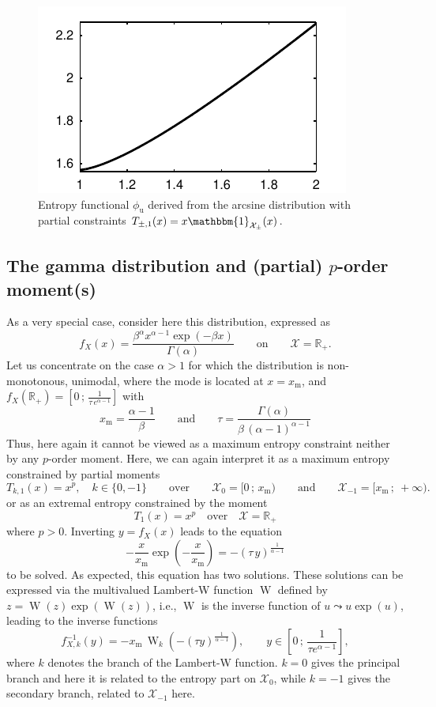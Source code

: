 \documentclass[english,sort&compress]{elsarticle}
\theoremstyle{definition}
\theoremstyle{plain}
\theoremstyle{plain}
\def\Rset{\mathbb{R}}
\def\X{\mathcal{X}}
\def\un{\mathbbm{1}}
\def\W{\operatorname{W}}
\begin{document}
\begin{figure}[htbp]
\centerline{\includegraphics[width=.43\textwidth]{PDF/MaxEnt_ArcsineLaw}}
\caption{Entropy  functional   $\phi_{\mathrm{u}}$  derived  from   the  arcsine
  distribution with partial constraints $T_{\pm,1}(x) = x \un_{\X_\pm}(x)$.}
\label{fig:Entropy-arcsin}
\end{figure}



\subsection{The gamma distribution and (partial) $p$-order moment(s)}

\label{subsec:GammaFirstOrder}

As a very special case, consider here this distribution, expressed
as
%
\[
f_X(x) = \frac{\beta^\alpha  x^{\alpha-1} \exp(-\beta x)}{\Gamma(\alpha)} \qquad
\mbox{on} \qquad \X = \Rset_+.
\]
%
Let  us concentrate  on the  case $\alpha  > 1$  for which  the  distribution is
non-monotonous, unimodal, where the mode is located at $x = x_{\mathrm{m}}$, and
$f_X(\Rset_+) = \left[ 0 \, ; \, \frac1{\tau \,e^{\alpha-1}} \right]$ with
%
\[
x_{\mathrm{m}}  =   \frac{\alpha-1}{\beta}  \qquad  \mbox{and}   \qquad  \tau  =
\frac{\Gamma(\alpha)}{\beta \, (\alpha-1)^{\alpha-1}}
\]
%
Thus, here again it cannot be  viewed as a maximum entropy constraint neither by
any $p$-order  moment.  Here,  we can  again interpret it  as a  maximum entropy
constrained by partial moments
%
\[
T_{k,1}(x) = x^p, \quad k \in \{ 0  , -1 \} \qquad \mbox{over} \qquad \X_0 = [ 0
\, ; \, x_{\mathrm{m}} ) \qquad  \mbox{and} \qquad \X_{-1} = [ x_{\mathrm{m}} \,
; \: +\infty ).
\]
%
or as an extremal entropy constrained by the moment 
%
\[
T_1(x) = x^p \quad \mbox{over} \quad \X = \Rset_+
\]
%
where $p > 0$. Inverting $y = f_X(x)$ leads to the equation
%
\[
-  \frac{x}{x_{\mathrm{m}}} \exp\left(  - \frac{x}{x_{\mathrm{m}}}  \right)  = -
(\tau  \,  y )^{\frac{1}{\alpha -  1}}
\]
%
to be solved. As expected, this  equation has two solutions. These solutions can
be  expressed   via  the   multivalued  Lambert-W   function  $\W$   defined  by
$z=\W(z)\exp(\W(z))$,  i.e., $\W$  is  the  inverse function  of  $u \leadsto  u
\exp(u)$\cite[\S~1]{CorGon96}, leading to the inverse functions
\[
f_{X,k}^{-1}(y) = - x_{\mathrm{m}}  \, \W_k\left( - (\tau y)^{\frac{1}{\alpha
      - 1}} \right), \qquad y \in \left[ 0 \, ; \, \frac{1}{\tau e^{\alpha - 1}}
\right],
\]
%
where  $k$  denotes  the branch  of  the  Lambert-W  function. $k=0$  gives  the
principal branch and here it is related  to the entropy part on $\X_0$, while $k
= -1$ gives the secondary branch, related to $\X_{-1}$ here.
\end{document}
